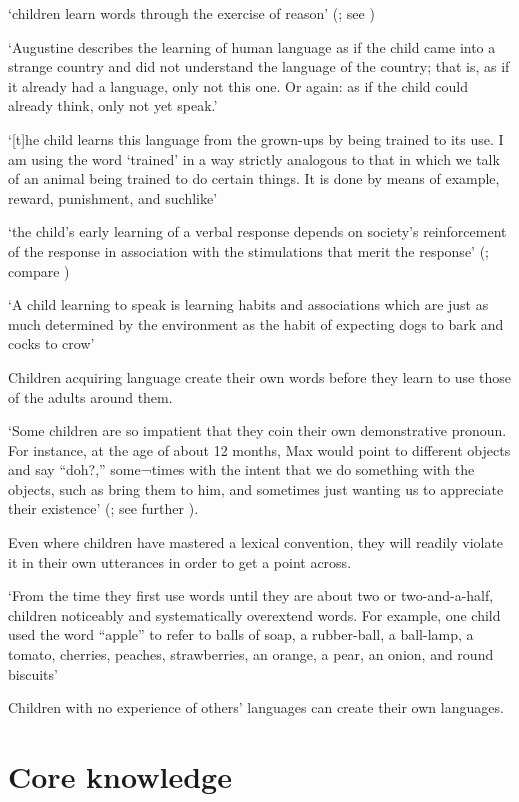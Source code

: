 \documentclass[12pt]{extarticle}
\begin{document}
\begin{multicols}{3}
‘children learn words through the exercise of reason’
(\citealp[p.\ 1103]{Bloom:2001ka}; see \citealp{Bloom:2000qz})
 
‘Augustine describes the learning of human language as if the child came into a strange country and did not understand the language of the country; that is, as if it already had a language, only not this one. Or again: as if the child could already think, only not yet speak.’
\citep[15--16, §32]{Wittgenstein:1953mm}
 
‘[t]he child learns this language from the grown-ups by being trained to its use. I am using the word ‘trained’ in a way strictly analogous to that in which we talk of an animal being trained to do certain things. It is done by means of example, reward, punishment, and suchlike’
\citep[p.\ 77]{Wittgenstein:1972lj}
 
‘the child's early learning of a verbal response depends on society's reinforcement of the response in association with the stimulations that merit the response’
(\citep[p.\ 82]{Quine:1960fe}; compare \citep[pp.\ 28--9]{Quine:1974rd})
 
‘A child learning to speak is learning habits and associations which are just as much determined by the environment as the habit of expecting dogs to bark and cocks to crow’
\citep[p.\ 71]{Russell:1921ww}
 
Children acquiring language create their own words before they learn to use those of the adults around them.
 
‘Some children are so impatient that they coin their own demonstrative pronoun. For instance, at the age of about 12 months, Max would point to different objects and say “doh?,” some¬times with the intent that we do something with the objects, such as bring them to him, and sometimes just wanting us to appreciate their existence’
(\citealp[p.\ 122]{Bloom:2000qz}; see further \citealp{Clark:1981bi,Clark:1982hj}).
 
Even where children have mastered a lexical convention, they will readily violate it in their own utterances in order to get a point across.
 
‘From the time they first use words until they are about two or two-and-a-half, children noticeably and systematically overextend words. For example, one child used the word “apple” to refer to balls of soap, a rubber-ball, a ball-lamp, a tomato, cherries, peaches, strawberries, an orange, a pear, an onion, and round biscuits’
\citep[p.\ 35]{Clark:1993bv}
 
Children with no experience of others' languages can create their own languages.
\citep{Kegl:1999es,Senghas:2001zm,Goldin-Meadow:2003pj}
 
 
 
\section{Core knowledge}
 


 
\footnotesize 


\end{multicols}
\end{document}
